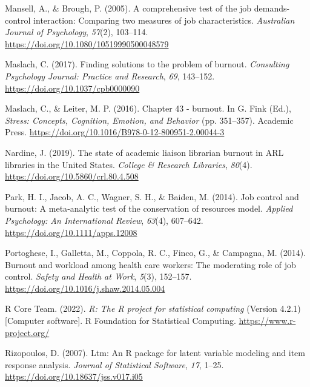 \documentclass[
  twocolumn]{article}
\newlength{\cslhangindent}
\newenvironment{CSLReferences}[2] %
 {\begin{list}{}{%
  \setlength{\itemindent}{0pt}
  \setlength{\leftmargin}{0pt}
  \setlength{\parsep}{0pt}
  \ifodd #1
   \setlength{\leftmargin}{\cslhangindent}
   \setlength{\itemindent}{-1\cslhangindent}
  \fi
  \setlength{\itemsep}{#2\baselineskip}}}
 {\end{list}}
\begin{document}
\begin{CSLReferences}{1}{0}
Mansell, A., \& Brough, P. (2005). A comprehensive test of the job
demands-control interaction: Comparing two measures of job
characteristics. \emph{Australian Journal of Psychology}, \emph{57}(2),
103--114. \url{https://doi.org/10.1080/10519990500048579}

Maslach, C. (2017). Finding solutions to the problem of burnout.
\emph{Consulting Psychology Journal: Practice and Research}, \emph{69},
143--152. \url{https://doi.org/10.1037/cpb0000090}

Maslach, C., \& Leiter, M. P. (2016). Chapter 43 - burnout. In G. Fink
(Ed.), \emph{Stress: {Concepts}, {Cognition}, {Emotion}, and {Behavior}}
(pp. 351--357). Academic Press.
\url{https://doi.org/10.1016/B978-0-12-800951-2.00044-3}

Nardine, J. (2019). The state of academic liaison librarian burnout in
{ARL} libraries in the {United States}. \emph{College \& Research
Libraries}, \emph{80}(4). \url{https://doi.org/10.5860/crl.80.4.508}

Park, H. I., Jacob, A. C., Wagner, S. H., \& Baiden, M. (2014). Job
control and burnout: A meta‐analytic test of the conservation of
resources model. \emph{Applied Psychology: An International Review},
\emph{63}(4), 607--642. \url{https://doi.org/10.1111/apps.12008}

Portoghese, I., Galletta, M., Coppola, R. C., Finco, G., \& Campagna, M.
(2014). Burnout and workload among health care workers: The moderating
role of job control. \emph{Safety and Health at Work}, \emph{5}(3),
152--157. \url{https://doi.org/10.1016/j.shaw.2014.05.004}

R Core Team. (2022). \emph{R: The {R} project for statistical computing}
(Version 4.2.1) {[}Computer software{]}. R Foundation for Statistical
Computing. \url{https://www.r-project.org/}

Rizopoulos, D. (2007). Ltm: An {R} package for latent variable modeling
and item response analysis. \emph{Journal of Statistical Software},
\emph{17}, 1--25. \url{https://doi.org/10.18637/jss.v017.i05}


\end{CSLReferences}
\end{document}
